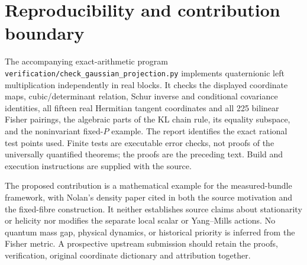 \documentclass[11pt,a4paper]{article}
\numberwithin{equation}{section}
\theoremstyle{definition}
\theoremstyle{remark}
\begin{document}
\section{Reproducibility and contribution boundary}\label{sec:verification}

The accompanying exact-arithmetic program
\texttt{verification/check\_gaussian\_projection.py} implements quaternionic
left multiplication independently in real blocks. It checks the displayed
coordinate maps, cubic/determinant relation, Schur inverse and conditional
covariance identities, all fifteen real Hermitian tangent coordinates
and all 225 bilinear Fisher pairings, the algebraic parts of the KL
chain rule, its equality subspace, and the noninvariant fixed-$P$ example.
The report identifies the exact rational test points used. Finite tests
are executable error checks, not proofs of the universally quantified
theorems; the proofs are the preceding text. Build and execution
instructions are supplied with the source.

The proposed contribution is a mathematical example for the measured-bundle
framework, with Nolan's density paper cited in both the source motivation
and the fixed-fibre construction. It neither establishes source claims
about stationarity or helicity nor modifies the separate local scalar or
Yang--Mills actions. No quantum mass gap, physical dynamics, or historical
priority is inferred from the Fisher metric. A prospective upstream
submission should retain the proofs, verification, original coordinate
dictionary and attribution together.


\end{document}

